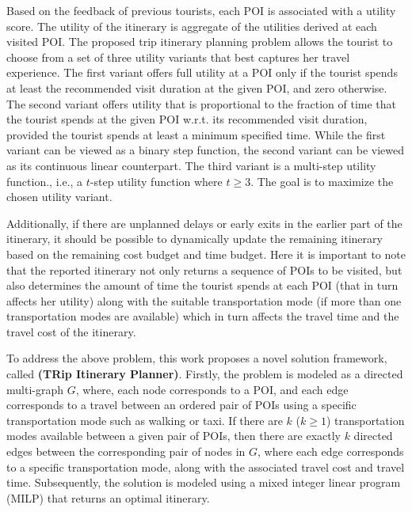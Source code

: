 Based on the feedback of previous tourists, each POI is associated with a utility score. 
The utility of the itinerary is aggregate of the utilities derived at each visited POI. The proposed trip itinerary planning problem allows the tourist to choose from a set of three utility variants that best captures her travel experience. The first variant offers full utility at a POI only if the tourist spends at least the recommended visit duration at the given POI, and zero otherwise. The second variant offers utility that is proportional to the fraction of time that the tourist spends at the given POI w.r.t. its recommended visit duration, provided the tourist  spends at least a minimum specified time. While the first variant can be viewed as a binary step function, the second variant can be viewed as its continuous linear counterpart. The third variant is a multi-step utility function., i.e., a $t$-step utility function where $t \ge 3$. The goal is to maximize the chosen utility variant.

Additionally, if there are unplanned delays or early exits in the earlier part of the itinerary, it should be possible to dynamically update the remaining itinerary based on the remaining cost budget and time budget. Here it is important to note that the reported itinerary not only returns a sequence of POIs to be visited, but also determines the amount of time the tourist spends at each POI (that in turn affects her utility) along with the suitable transportation mode (if more than one transportation modes are available) which in turn affects the travel time and the travel cost of the itinerary.

To address the above problem, this work proposes a novel solution framework,  called \textbf{\trip (TRip Itinerary Planner)}.  Firstly, the problem is modeled as a directed multi-graph $G$, where, each node corresponds to a POI, and each edge corresponds to a travel between an ordered pair of POIs using a specific transportation mode such as walking or taxi. If there are $k$ ($k \ge 1$) transportation modes available between a given pair of POIs, then there are exactly $k$ directed edges between the corresponding pair of nodes in $G$, where each edge corresponds to a specific transportation mode, along with the associated travel cost and travel time. Subsequently, the solution is modeled using a mixed integer linear program (MILP) that returns an optimal itinerary. 

